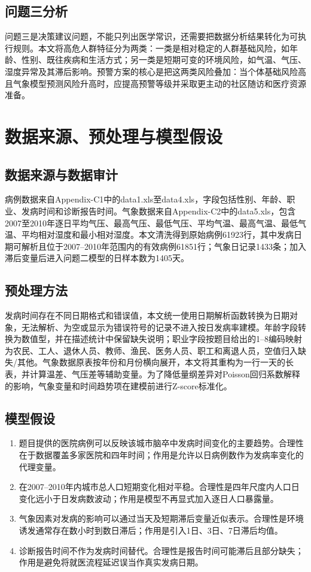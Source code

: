 \documentclass[UTF8,a4paper,12pt]{ctexart}
\begin{document}
\subsection{问题三分析}
问题三是决策建议问题，不能只列出医学常识，还需要把数据分析结果转化为可执行规则。本文将高危人群特征分为两类：一类是相对稳定的人群基础风险，如年龄、性别、既往疾病和生活方式；另一类是短期可变的环境风险，如气温、气压、湿度异常及其滞后影响。预警方案的核心是把这两类风险叠加：当个体基础风险高且气象模型预测风险升高时，应提高预警等级并采取更主动的社区随访和医疗资源准备。

\section{数据来源、预处理与模型假设}
\subsection{数据来源与数据审计}
病例数据来自Appendix-C1中的data1.xls至data4.xls，字段包括性别、年龄、职业、发病时间和诊断报告时间。气象数据来自Appendix-C2中的data5.xls，包含2007至2010年逐日平均气压、最高气压、最低气压、平均气温、最高气温、最低气温、平均相对湿度和最小相对湿度。本文清洗得到原始病例61923行，其中发病日期可解析且位于2007--2010年范围内的有效病例61851行；气象日记录1433条；加入滞后变量后进入问题二模型的日样本数为1405天。

\subsection{预处理方法}
发病时间存在不同日期格式和错误值，本文统一使用日期解析函数转换为日期对象，无法解析、为空或显示为错误符号的记录不进入按日发病率建模。年龄字段转换为数值型，并在描述统计中保留缺失说明；职业字段按题目给出的1--8编码映射为农民、工人、退休人员、教师、渔民、医务人员、职工和离退人员，空值归入缺失/其他。气象数据原表按年份和月份横向展开，本文将其重构为一行一天的长表，并计算温差、气压差等辅助变量。为了降低量纲差异对Poisson回归系数解释的影响，气象变量和时间趋势项在建模前进行Z-score标准化。

\subsection{模型假设}
\begin{enumerate}[label=假设\arabic*：]
\item 题目提供的医院病例可以反映该城市脑卒中发病时间变化的主要趋势。合理性在于数据覆盖多家医院和四年时间；作用是允许以日病例数作为发病率变化的代理变量。
\item 在2007--2010年内城市总人口短期变化相对平稳。合理性是四年尺度内人口日变化远小于日发病数波动；作用是模型不再显式加入逐日人口暴露量。
\item 气象因素对发病的影响可以通过当天及短期滞后变量近似表示。合理性是环境诱发通常存在数小时到数日滞后；作用是引入1日、3日、7日滞后均值。
\item 诊断报告时间不作为发病时间替代。合理性是报告时间可能滞后且部分缺失；作用是避免将就医流程延迟误当作真实发病日期。
\end{enumerate}
\end{document}
